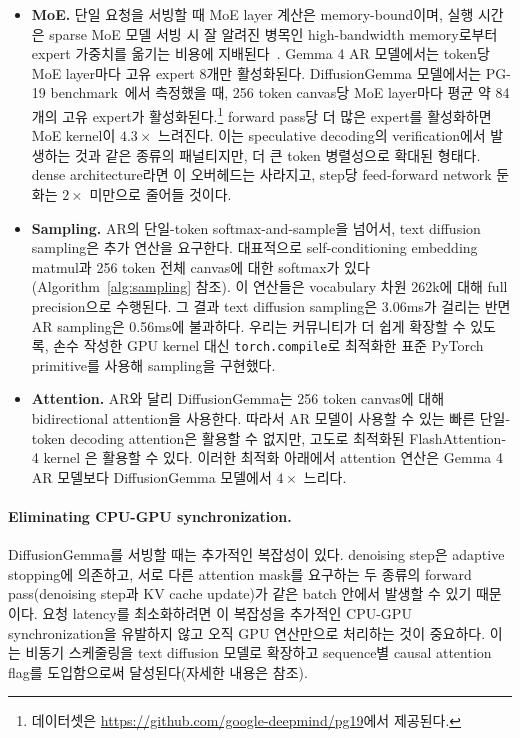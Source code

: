 \documentclass[11pt, a4paper, logo, copyright, gdm]{google}
\begin{document}
\begin{itemize}[topsep=0pt]
    \item \textbf{MoE.} 단일 요청을 서빙할 때 MoE layer 계산은 memory-bound이며, 실행 시간은 sparse MoE 모델 서빙 시 잘 알려진 병목인 high-bandwidth memory로부터 expert 가중치를 옮기는 비용에 지배된다~\citep{rajbhandari2022deepspeedmoe, huang2024efficient}. Gemma 4 AR 모델에서는 token당 MoE layer마다 고유 expert 8개만 활성화된다. DiffusionGemma 모델에서는 PG-19 benchmark~\citep{rae2020compressive}에서 측정했을 때, 256 token canvas당 MoE layer마다 평균 약 84개의 고유 expert가 활성화된다.\footnote{데이터셋은 \url{https://github.com/google-deepmind/pg19}에서 제공된다.} forward pass당 더 많은 expert를 활성화하면 MoE kernel이 $4.3\times$ 느려진다. 이는 speculative decoding의 verification에서 발생하는 것과 같은 종류의 패널티지만, 더 큰 token 병렬성으로 확대된 형태다. dense architecture라면 이 오버헤드는 사라지고, step당 feed-forward network 둔화는 $2\times$ 미만으로 줄어들 것이다.
    \item \textbf{Sampling.} AR의 단일-token softmax-and-sample을 넘어서, text diffusion sampling은 추가 연산을 요구한다. 대표적으로 self-conditioning embedding matmul과 256 token 전체 canvas에 대한 softmax가 있다(Algorithm~\ref{alg:sampling} 참조). 이 연산들은 vocabulary 차원 262k에 대해 full precision으로 수행된다. 그 결과 text diffusion sampling은 3.06ms가 걸리는 반면 AR sampling은 0.56ms에 불과하다. 우리는 커뮤니티가 더 쉽게 확장할 수 있도록, 손수 작성한 GPU kernel 대신 \texttt{torch.compile}로 최적화한 표준 PyTorch primitive를 사용해 sampling을 구현했다.
    \item \textbf{Attention.} AR와 달리 DiffusionGemma는 256 token canvas에 대해 bidirectional attention을 사용한다. 따라서 AR 모델이 사용할 수 있는 빠른 단일-token decoding attention은 활용할 수 없지만, 고도로 최적화된 FlashAttention-4 kernel \citep{dao2022flashattention, zadouri2026flashattention4}은 활용할 수 있다. 이러한 최적화 아래에서 attention 연산은 Gemma 4 AR 모델보다 DiffusionGemma 모델에서 $4\times$ 느리다.
\end{itemize}

\paragraph{Eliminating CPU-GPU synchronization.} DiffusionGemma를 서빙할 때는 추가적인 복잡성이 있다. denoising step은 adaptive stopping에 의존하고, 서로 다른 attention mask를 요구하는 두 종류의 forward pass(denoising step과 KV cache update)가 같은 batch 안에서 발생할 수 있기 때문이다. 요청 latency를 최소화하려면 이 복잡성을 추가적인 CPU-GPU synchronization을 유발하지 않고 오직 GPU 연산만으로 처리하는 것이 중요하다. 이는 비동기 스케줄링을 text diffusion 모델로 확장하고 sequence별 causal attention flag를 도입함으로써 달성된다(자세한 내용은 \citealp{vllm2026diffusiongemma} 참조).
\end{document}
